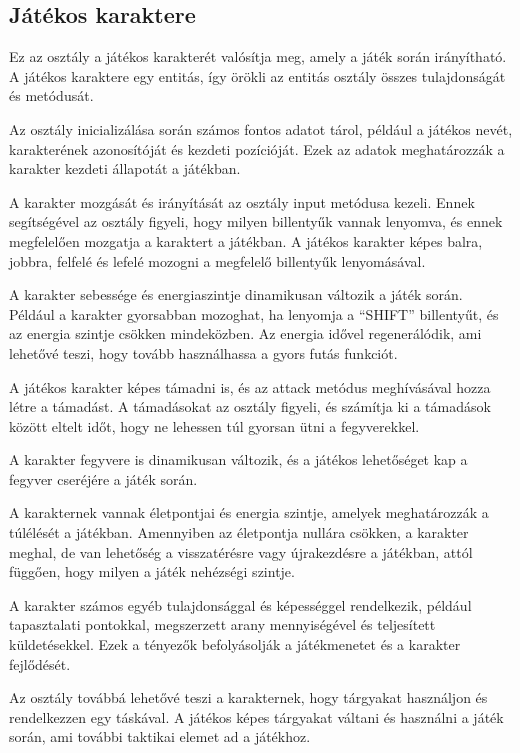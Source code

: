                     
\subsection{Játékos karaktere}
\indent \indent Ez az osztály a játékos karakterét valósítja meg, amely a játék során irányítható. A játékos karaktere egy entitás, így örökli az entitás osztály összes tulajdonságát és metódusát.

Az osztály inicializálása során számos fontos adatot tárol, például a játékos nevét, karakterének azonosítóját és kezdeti pozícióját. Ezek az adatok meghatározzák a karakter kezdeti állapotát a játékban.

A karakter mozgását és irányítását az osztály input metódusa kezeli. Ennek segítségével az osztály figyeli, hogy milyen billentyűk vannak lenyomva, és ennek megfelelően mozgatja a karaktert a játékban. A játékos karakter képes balra, jobbra, felfelé és lefelé mozogni a megfelelő billentyűk lenyomásával.

A karakter sebessége és energiaszintje dinamikusan változik a játék során. Például a karakter gyorsabban mozoghat, ha lenyomja a ``SHIFT'' billentyűt, és az energia szintje csökken mindeközben. Az energia idővel regenerálódik, ami lehetővé teszi, hogy tovább használhassa a gyors futás funkciót.

A játékos karakter képes támadni is, és az attack metódus meghívásával hozza létre a támadást. A támadásokat az osztály figyeli, és számítja ki a támadások között eltelt időt, hogy ne lehessen túl gyorsan ütni a fegyverekkel.

A karakter fegyvere is dinamikusan változik, és a játékos lehetőséget kap a fegyver cseréjére a játék során.

A karakternek vannak életpontjai és energia szintje, amelyek meghatározzák a túlélését a játékban. Amennyiben az életpontja nullára csökken, a karakter meghal, de van lehetőség a visszatérésre vagy újrakezdésre a játékban, attól függően, hogy milyen a játék nehézségi szintje.

A karakter számos egyéb tulajdonsággal és képességgel rendelkezik, például tapasztalati pontokkal, megszerzett arany mennyiségével és teljesített küldetésekkel. Ezek a tényezők befolyásolják a játékmenetet és a karakter fejlődését.

Az osztály továbbá lehetővé teszi a karakternek, hogy tárgyakat használjon és rendelkezzen egy táskával. A játékos képes tárgyakat váltani és használni a játék során, ami további taktikai elemet ad a játékhoz.

